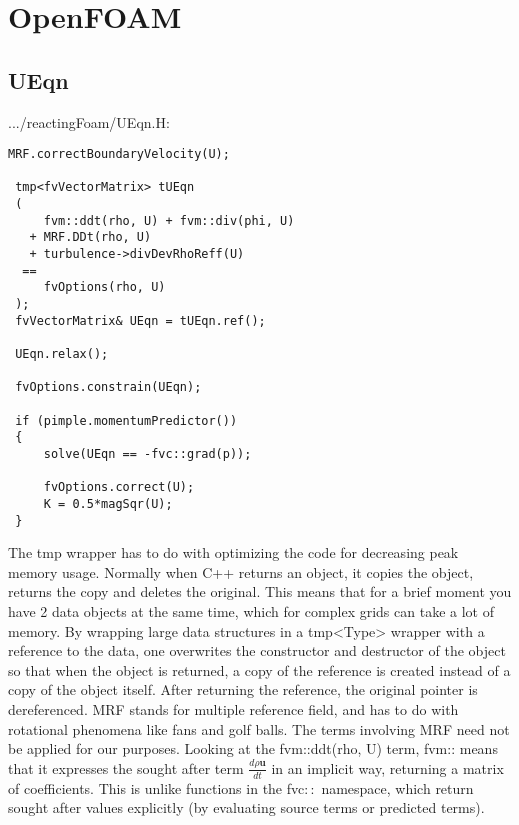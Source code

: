 
\chapter{OpenFOAM} %

\label{openfoam} %


\section{UEqn}

.../reactingFoam/UEqn.H:

\begin{verbatim}
MRF.correctBoundaryVelocity(U);
 
 tmp<fvVectorMatrix> tUEqn
 (
     fvm::ddt(rho, U) + fvm::div(phi, U)
   + MRF.DDt(rho, U)
   + turbulence->divDevRhoReff(U)
  ==
     fvOptions(rho, U)
 );
 fvVectorMatrix& UEqn = tUEqn.ref();
 
 UEqn.relax();
 
 fvOptions.constrain(UEqn);
 
 if (pimple.momentumPredictor())
 {
     solve(UEqn == -fvc::grad(p));
 
     fvOptions.correct(U);
     K = 0.5*magSqr(U);
 }
\end{verbatim} 
\vspace{\baselineskip}
The tmp wrapper has to do with optimizing the code for decreasing peak memory usage. Normally when C++ returns an object, it copies the object, returns the copy and deletes the original. This means that for a brief moment you have 2 data objects at the same time, which for complex grids can take a lot of memory. By wrapping large data structures in a tmp<Type> wrapper with a reference to the data, one overwrites the constructor and destructor of the object so that when the object is returned, a copy of the reference is created instead of a copy of the object itself. After returning the reference, the original pointer is dereferenced.
\vspace{\baselineskip}
MRF stands for multiple reference field, and has to do with rotational phenomena like fans and golf balls. The terms involving MRF need not be applied for our purposes.
\vspace{\baselineskip}
Looking at the fvm::ddt(rho, U) term, fvm:: means that it expresses the sought after term $\frac{d \rho \textbf{u}}{dt}$ in an implicit way, returning a matrix of coefficients. This is unlike functions in the fvc$::$ namespace, which return sought after values explicitly (by evaluating source terms or predicted terms).
